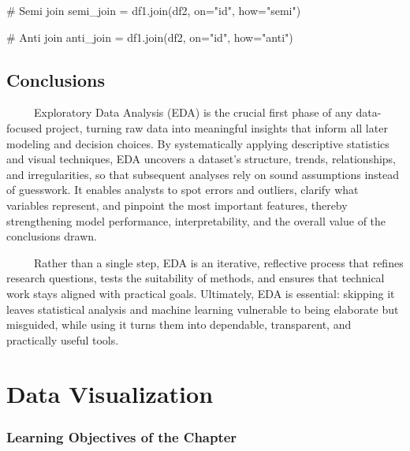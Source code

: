 \documentclass[
  letterpaper,
  DIV=11,
  numbers=noendperiod]{scrreprt}
\newenvironment{Shaded}{\begin{snugshade}}{\end{snugshade}}
\newcommand{\CommentTok}[1]{\textcolor[rgb]{0.37,0.37,0.37}{#1}}
\newcommand{\NormalTok}[1]{\textcolor[rgb]{0.00,0.23,0.31}{#1}}
\newcommand{\OperatorTok}[1]{\textcolor[rgb]{0.37,0.37,0.37}{#1}}
\newcommand{\StringTok}[1]{\textcolor[rgb]{0.13,0.47,0.30}{#1}}
\begin{document}
\begin{Shaded}
\begin{Highlighting}[]
\CommentTok{\# Semi join}
\NormalTok{semi\_join }\OperatorTok{=}\NormalTok{ df1.join(df2, on}\OperatorTok{=}\StringTok{"id"}\NormalTok{, how}\OperatorTok{=}\StringTok{"semi"}\NormalTok{)}
\end{Highlighting}
\end{Shaded}

\begin{Shaded}
\begin{Highlighting}[]
\CommentTok{\# Anti join}
\NormalTok{anti\_join }\OperatorTok{=}\NormalTok{ df1.join(df2, on}\OperatorTok{=}\StringTok{"id"}\NormalTok{, how}\OperatorTok{=}\StringTok{"anti"}\NormalTok{)}
\end{Highlighting}
\end{Shaded}

\section{Conclusions}\label{conclusions}

~~~~~Exploratory Data Analysis (EDA) is the crucial first phase of any
data-focused project, turning raw data into meaningful insights that
inform all later modeling and decision choices. By systematically
applying descriptive statistics and visual techniques, EDA uncovers a
dataset's structure, trends, relationships, and irregularities, so that
subsequent analyses rely on sound assumptions instead of guesswork. It
enables analysts to spot errors and outliers, clarify what variables
represent, and pinpoint the most important features, thereby
strengthening model performance, interpretability, and the overall value
of the conclusions drawn.

~~~~~Rather than a single step, EDA is an iterative, reflective process
that refines research questions, tests the suitability of methods, and
ensures that technical work stays aligned with practical goals.
Ultimately, EDA is essential: skipping it leaves statistical analysis
and machine learning vulnerable to being elaborate but misguided, while
using it turns them into dependable, transparent, and practically useful
tools.

\chapter{Data Visualization}\label{data-visualization}

\subsection*{Learning Objectives of the
Chapter}\label{learning-objectives-of-the-chapter-3}
\end{document}
